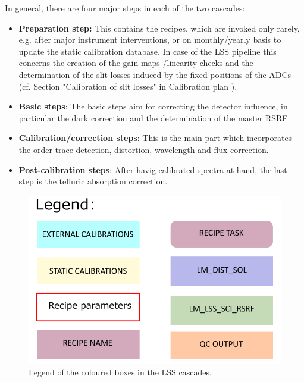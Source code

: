 In general, there are four major steps in each of the two cascades:
\begin{itemize}
    \item \textbf{Preparation step:} This contains the recipes, which are invoked only rarely, e.g. after major instrument interventions, or on monthly/yearly basis to update the static calibration database. In case of the \ac{LSS} pipeline this concerns the creation of the gain maps /linearity checks and the determination of the slit losses induced by the fixed positions of the ADCs (cf. Section "Calibration of slit losses" in Calibration plan \cite{METIS-calibration_plan}).
    \item \textbf{Basic steps}: The basic steps aim for correcting the detector influence, in particular the dark correction and the determination of the master \ac{RSRF}.
    \item \textbf{Calibration/correction steps}: This is the main part which incorporates the order trace detection, distortion, wavelength and flux correction.
    \item \textbf{Post-calibration steps}: After havig calibrated spectra at hand, the last step is the telluric absorption correction.
\end{itemize}

\begin{figure}[ht]
  \centering
  \includegraphics[width=0.4\textheight]{figures/legend.pdf}
  \caption[Legend]{Legend of the coloured boxes in the \ac{LSS} cascades.}
  \label{Fig:LSScascadelegend}
\end{figure}
\clearpage

